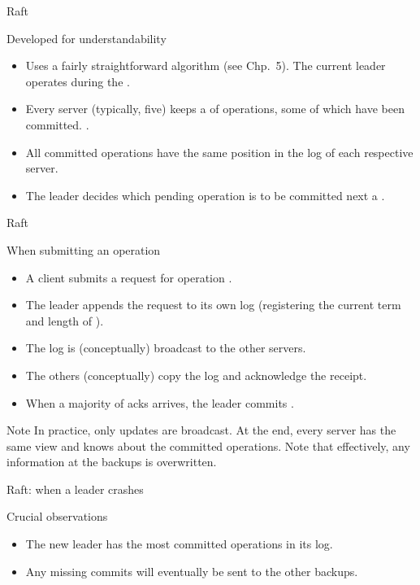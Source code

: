 \begin{slide}{Raft}
  \begin{block}{Developed for understandability}
    \begin{itemize}
    \item Uses a fairly straightforward  algorithm (see Chp.~5). The current leader
      operates during the  .
    \item Every server (typically, five) keeps a  of operations, some of which have been
      committed. .
    \item All committed operations have the same position in the log of each respective server.
    \item The leader decides which pending operation is to be committed next \mathexpr{\Rightarrow} a
      .
    \end{itemize}
  \end{block}
\end{slide}
\begin{slide}{Raft}
  \begin{block}{When submitting an operation}
    \begin{itemize}
    \item A client submits a request for operation .
    \item The leader appends the request  to its own log
      (registering the current term  and length of ).
    \item The log is (conceptually) broadcast to the other servers.
    \item The others (conceptually) copy the log and acknowledge the receipt.
    \item When a majority of acks arrives, the leader commits .
    \end{itemize}
  \end{block}

  \begin{alertblock}{Note}
    In practice, only updates are broadcast. At the end, every server has the same view and knows about the
     committed operations. Note that effectively, any information at the backups is overwritten.
  \end{alertblock}
\end{slide}
\begin{slide}{Raft: when a leader crashes}
  \begin{centerfig}
  \end{centerfig}
  \begin{alertblock}{Crucial observations}
    \begin{itemize}
    \item The new leader has the most committed operations in its log.
    \item Any missing commits will eventually be sent to the other backups.
    \end{itemize}
  \end{alertblock}
\end{slide}
